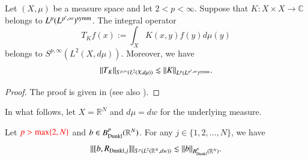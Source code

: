 \documentclass[12pt]{amsart}
\begin{document}
\begin{lemma}\label{Russo}
Let $(X,\mu)$ be a measure space and let $2<p<\infty$. Suppose that $K:X\times X\rightarrow \mathbb{C}$ belongs to $L^p(L^{p',\infty})^{\rm symm}$. The integral operator $$T_Kf(x):=\int_X K(x,y)f(y)d\mu(y)$$
belongs to $S^{p,\infty}(L^2(X,d\mu))$. Moreover, we have
\begin{align}
  \|T_K\|_{S^{p,\infty}(L^2(X,d\mu))}\lesssim \|K\|_{L^p(L^{p',\infty})^{\rm symm}}.
\end{align}
\end{lemma}
\begin{proof}
The proof is given in \cite[Lemma 2]{JW} (see also \cite[Corollary 11.2]{HKarxiv}).
\end{proof}
In what follows, let $X=\mathbb{R}^N$ and $d\mu=dw$ for the underlying measure.
\begin{proposition}\label{upper bound}
    Let ${\color{red}p>\max\{2,N\}}$ and $b\in B^p_{{\rm Dunkl}}(\mathbb{R}^N)$. For any $j\in\{1,2,\ldots,N\}$, we have
    $$\|[b,R_{{\rm Dunkl},j}]\|_{S^{p}(L^2(\mathbb{R}^N,dw))}\lesssim\|b\|_{B^p_{{\rm Dunkl}}(\mathbb{R}^N)}.$$
\end{proposition}
\end{document}
